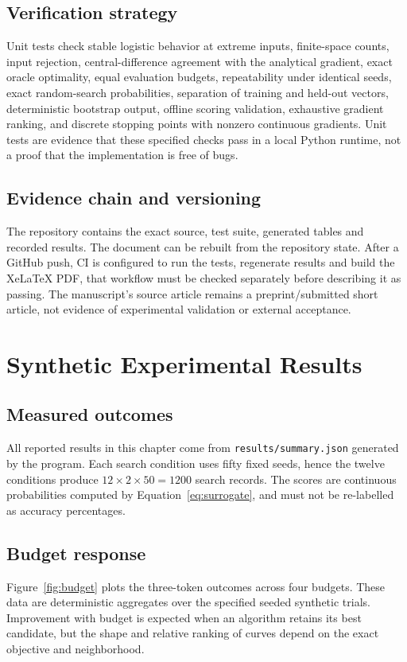 \documentclass[12pt,a4paper,oneside]{report}
\begin{document}
\section{Verification strategy}
Unit tests check stable logistic behavior at extreme inputs, finite-space counts, input rejection, central-difference agreement with the analytical gradient, exact oracle optimality, equal evaluation budgets, repeatability under identical seeds, exact random-search probabilities, separation of training and held-out vectors, deterministic bootstrap output, offline scoring validation, exhaustive gradient ranking, and discrete stopping points with nonzero continuous gradients. Unit tests are evidence that these specified checks pass in a local Python runtime, not a proof that the implementation is free of bugs.

\section{Evidence chain and versioning}
The repository contains the exact source, test suite, generated tables and recorded results. The document can be rebuilt from the repository state. After a GitHub push, CI is configured to run the tests, regenerate results and build the XeLaTeX PDF, that workflow must be checked separately before describing it as passing. The manuscript's source article remains a preprint/submitted short article, not evidence of experimental validation or external acceptance.

\chapter{Synthetic Experimental Results}
\section{Measured outcomes}
All reported results in this chapter come from \texttt{results/summary.json} generated by the program. Each search condition uses fifty fixed seeds, hence the twelve conditions produce $12\times2\times50=1200$ search records. The scores are continuous probabilities computed by Equation~\eqref{eq:surrogate}, and must not be re-labelled as accuracy percentages.



\section{Budget response}
Figure~\ref{fig:budget} plots the three-token outcomes across four budgets. These data are deterministic aggregates over the specified seeded synthetic trials. Improvement with budget is expected when an algorithm retains its best candidate, but the shape and relative ranking of curves depend on the exact objective and neighborhood.
\end{document}
